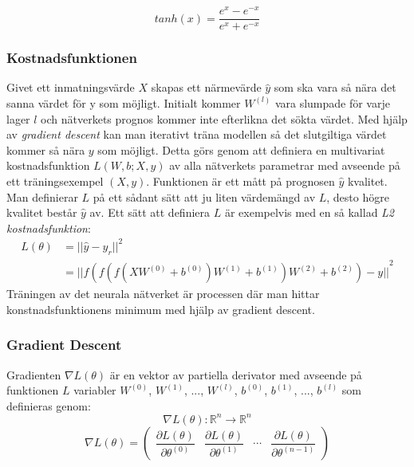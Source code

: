 \documentclass[a4paper,11pt,twoside]{article}
\newcommand*{\pd}[2]{\ensuremath{\dfrac{\partial #1}{\partial #2}}}
\begin{document}
\begin{equation}
tanh(x) = \frac{e^x-e^{-x}}{e^x+e^{-x}}
\end{equation}

\subsubsection{Kostnadsfunktionen}
Givet ett inmatningsvärde $X$ skapas ett närmevärde $\hat{y}$ som ska vara så nära det sanna värdet för y som möjligt. Initialt kommer $W^{(l)}$ vara slumpade för varje lager $l$ och nätverkets prognos kommer inte efterlikna det sökta värdet. Med hjälp av \textit{gradient descent} kan man iterativt träna modellen så det slutgiltiga värdet kommer så nära $y$ som möjligt. Detta görs genom att definiera en multivariat kostnadsfunktion $L(W, b; X,y)$ av alla nätverkets parametrar med avseende på ett träningsexempel $(X, y)$. Funktionen är ett mått på prognosen $\hat{y}$ kvalitet. Man definierar $L$ på ett sådant sätt att ju liten värdemängd av $L$, desto högre kvalitet består $\hat{y}$ av. Ett sätt att definiera $L$ är exempelvis med en så kallad \textit{L2 kostnadsfunktion}: \cite{cs231n} \cite{wikiStanford}
\begin{equation}
\begin{split}
L(\theta) 	& = {||\hat{y}-y_r||}^2 \\
		& = {||f(f(f(XW^{(0)} +b^{(0)})W^{(1)} +b^{(1)})W^{(2)} +b^{(2)}) - y||}^2
\end{split}
\end{equation}
Träningen av det neurala nätverket är processen där man hittar konstnadsfunktionens minimum med hjälp av gradient descent.
\subsubsection{Gradient Descent}
Gradienten $\nabla L(\theta)$ är en vektor av partiella derivator med avseende på funktionen $L$ variabler $W^{(0)}$, $W^{(1)}$, ..., $W^{(l)}$, $b^{(0)}$, $b^{(1)}$, ..., $b^{(l)}$ som definieras genom: \cite{gradient} \cite{convmath} 
\begin{equation}
\nabla L(\theta) : \mathbb{R}^n \to \mathbb{R}^n
\end{equation}
\begin{equation}
\nabla L(\theta) = 
	\begin{pmatrix} 
		\pd{L(\theta)}{\theta^{(0)}} & 
		\pd{L(\theta)}{\theta^{(1)}} &
		\cdots &
		\pd{L(\theta)}{\theta^{(n-1)}}
		
		\end{pmatrix}
\end{equation}
\end{document}
